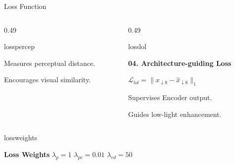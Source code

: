 \documentclass[
    11pt,%
    aspectratio=169,%
]{beamer}
\begin{document}
\begin{frame}{Loss Function}
\begin{columns}[T,onlytextwidth]
\begin{column}{0.49\textwidth}
\begin{beamercolorbox}[
    wd=\linewidth,
    sep=0.10cm,
    rounded=true
]{losspercep}
    \vspace{0.08cm}

    \raggedright
    Measures perceptual distance.

    Encourages visual similarity.

\end{beamercolorbox}

\end{column}


\begin{column}{0.49\textwidth}

\begin{beamercolorbox}[
    wd=\linewidth,
    sep=0.10cm,
    rounded=true
]{losslol}

    {\color{LossNavy}\bfseries 04. Architecture-guiding Loss}

    \vspace{0.10cm}

    \centering
    $\displaystyle
    \mathcal{L}_{lol}
    =
    \|x_{\downarrow 8}
    -
    \hat{x}_{\downarrow 8}\|_1
    $

    \vspace{0.08cm}

    \raggedright
    Supervises Encoder output.

    Guides low-light enhancement.

\end{beamercolorbox}

\end{column}

\end{columns}

\vspace{0.12cm}


\begin{beamercolorbox}[
    wd=\textwidth,
    sep=0.08cm,
    rounded=true
]{lossweights}

    \centering

    {\bfseries Loss Weights}
    \hspace{0.25cm}
    $\lambda_p=1$
    \qquad
    $\lambda_{pe}=0.01$
    \qquad
    $\lambda_{ed}=50$

\end{beamercolorbox}

\end{frame}
\end{document}
